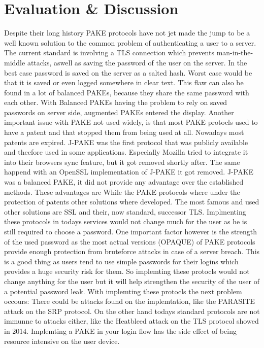 \documentclass[journal]{IEEEtran}
\begin{document}
\section{Evaluation \& Discussion}
Despite their long history PAKE protocols have not jet made the jump to be a well known solution to the common problem of authenticating a user to a server. 
The current standard is involving a TLS connection which prevents man-in-the-middle attacks, aswell as saving the password of the user on the server.
In the best case password is saved on the server as a salted hash. Worst case would be that it is saved or even logged somewhere in clear text.
This flaw can also be found in a lot of balanced PAKEs, because they share the same password with each other.
With Balanced PAKEs having the problem to rely on saved passwords on server side, augmented PAKEs entered the display.
Another important issue with PAKE not used widely, is that most PAKE protocls used to have a patent and that stopped them from being used at all.
Nowadays most patents are expired.
J-PAKE was the first protocol that was publicly available and theefore used in some applications. Especially Mozilla tried to integrate it into their browsers sync feature, but it got removed shortly after.
The same happend with an OpenSSL implementation of J-PAKE it got removed. J-PAKE was a balanced PAKE, it did not provide any advantage over the established methods. These advantages are 
While the PAKE protocols where under the protection of patents other solutions where developed. The most famous and used other solutions are SSL and their, now standard, successor TLS. 
Implmenting these protocols in todays services would not change much for the user as he is still required to choose a password. 
One important factor however is the strength of the used password as the most actual versions (OPAQUE) of PAKE protocols provide enough protection from bruteforce attacks in case of a server breach.
This is a good thing as users tend to use simple passwords for their logins which provides a huge security risk for them.
So implemting these protocls would not change anything for the user but it will help strengthen the security of the user of a potential password leak.
With implemting these protocls the next problem occours: There could be attacks found on the implemtation, like the PARASITE attack on the SRP protocol.
On the other hand todays standard protocols are not immunne to attacks either, like the Heatbleed attack on the TLS protocol showed in 2014.
Implemting a PAKE in your login flow has the side effect of being resource intensive on the user device. 
\end{document}

